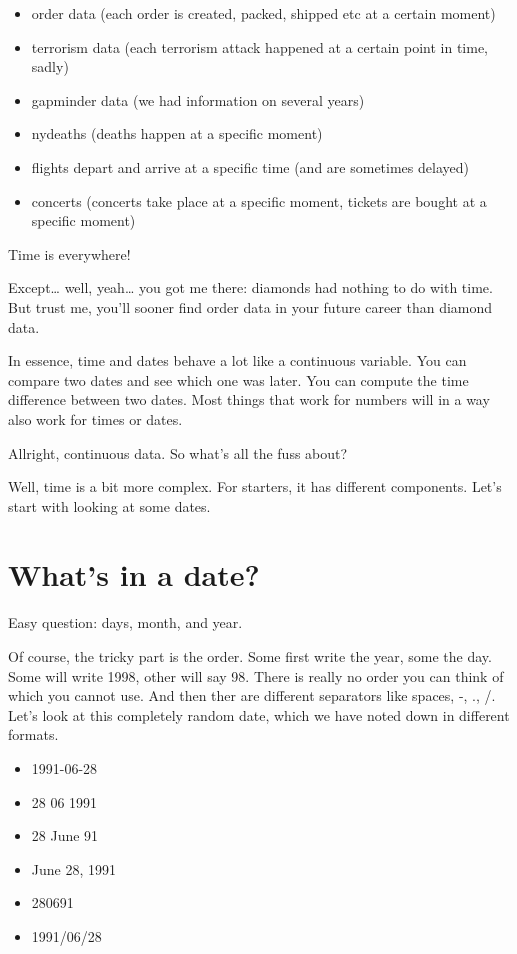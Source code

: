 \documentclass[]{tufte-book}
\providecommand{\tightlist}{%
  \setlength{\itemsep}{0pt}\setlength{\parskip}{0pt}}
\begin{document}
\begin{itemize}
\tightlist
\item
  order data (each order is created, packed, shipped etc at a certain moment)
\item
  terrorism data (each terrorism attack happened at a certain point in time, sadly)
\item
  gapminder data (we had information on several years)
\item
  nydeaths (deaths happen at a specific moment)
\item
  flights depart and arrive at a specific time (and are sometimes delayed)
\item
  concerts (concerts take place at a specific moment, tickets are bought at a specific moment)
\end{itemize}

Time is everywhere!

Except\ldots{} well, yeah\ldots{} you got me there: diamonds had nothing to do with time. But trust me, you'll sooner find order data in your future career than diamond data.

In essence, time and dates behave a lot like a continuous variable. You can compare two dates and see which one was later. You can compute the time difference between two dates. Most things that work for numbers will in a way also work for times or dates.

Allright, continuous data. So what's all the fuss about?

Well, time is a bit more complex. For starters, it has different components. Let's start with looking at some dates.

\hypertarget{whats-in-a-date}{%
\section{What's in a date?}\label{whats-in-a-date}}

Easy question: days, month, and year.

Of course, the tricky part is the order. Some first write the year, some the day. Some will write 1998, other will say 98. There is really no order you can think of which you cannot use. And then ther are different separators like spaces, -, ., /. Let's look at this completely random date, which we have noted down in different formats.

\begin{itemize}
\tightlist
\item
  1991-06-28
\item
  28 06 1991
\item
  28 June 91
\item
  June 28, 1991
\item
  280691
\item
  1991/06/28
\end{itemize}
\end{document}
